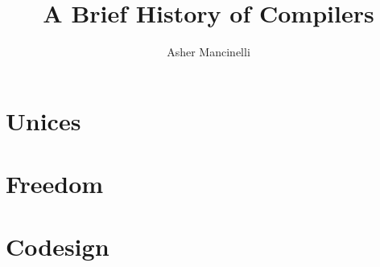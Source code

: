 \documentclass[12pt,openany]{book}
\title{A Brief History of Compilers}
\author{Asher Mancinelli}
\date{}
\begin{document}
\maketitle
\tableofcontents







\chapter{Unices}
\chapter{Freedom}
\chapter{Codesign}



\nocite{*}
\printbibliography[heading=bibintoc]
\end{document}
